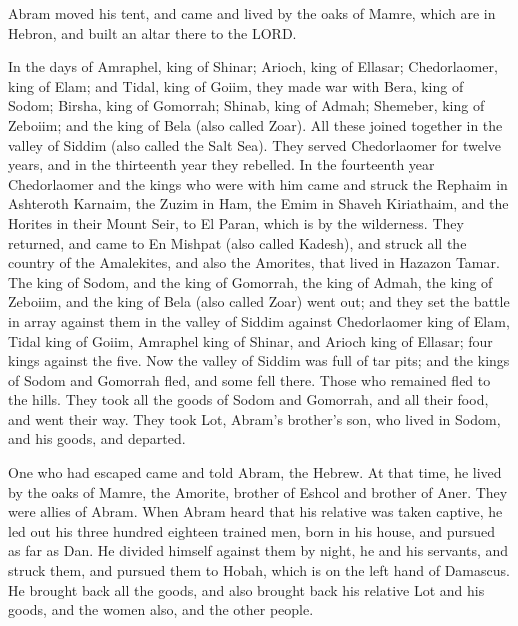 \myverse{}Abram moved his tent, and came and lived by the oaks of Mamre, which are in Hebron, and built an altar there to the LORD.

\mychapter{}
\myverse*{}In the days of Amraphel, king of Shinar; Arioch, king of Ellasar; Chedorlaomer, king of Elam; and Tidal, king of Goiim,  \myverse{}they made war with Bera, king of Sodom; Birsha, king of Gomorrah; Shinab, king of Admah; Shemeber, king of Zeboiim; and the king of Bela (also called Zoar).  \myverse{}All these joined together in the valley of Siddim (also called the Salt Sea).  \myverse{}They served Chedorlaomer for twelve years, and in the thirteenth year they rebelled.  \myverse{}In the fourteenth year Chedorlaomer and the kings who were with him came and struck the Rephaim in Ashteroth Karnaim, the Zuzim in Ham, the Emim in Shaveh Kiriathaim,  \myverse{}and the Horites in their Mount Seir, to El Paran, which is by the wilderness.  \myverse{}They returned, and came to En Mishpat (also called Kadesh), and struck all the country of the Amalekites, and also the Amorites, that lived in Hazazon Tamar.  \myverse{}The king of Sodom, and the king of Gomorrah, the king of Admah, the king of Zeboiim, and the king of Bela (also called Zoar) went out; and they set the battle in array against them in the valley of Siddim  \myverse{}against Chedorlaomer king of Elam, Tidal king of Goiim, Amraphel king of Shinar, and Arioch king of Ellasar; four kings against the five.  \myverse{}Now the valley of Siddim was full of tar pits; and the kings of Sodom and Gomorrah fled, and some fell there. Those who remained fled to the hills.  \myverse{}They took all the goods of Sodom and Gomorrah, and all their food, and went their way.  \myverse{}They took Lot, Abram’s brother’s son, who lived in Sodom, and his goods, and departed.

\myverse{}One who had escaped came and told Abram, the Hebrew. At that time, he lived by the oaks of Mamre, the Amorite, brother of Eshcol and brother of Aner. They were allies of Abram.  \myverse{}When Abram heard that his relative was taken captive, he led out his three hundred eighteen trained men, born in his house, and pursued as far as Dan.  \myverse{}He divided himself against them by night, he and his servants, and struck them, and pursued them to Hobah, which is on the left hand of Damascus.  \myverse{}He brought back all the goods, and also brought back his relative Lot and his goods, and the women also, and the other people.

